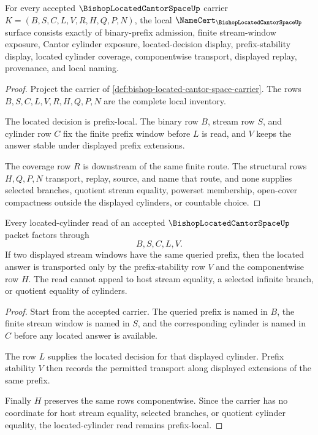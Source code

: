 \begin{theorem}
\label{thm:bishop-located-cantor-space-namecert-obligations}
For every accepted $\BishopLocatedCantorSpaceUp$ carrier $K=(B,S,C,L,V,R,H,Q,P,N)$, the local $\NameCert_{\BishopLocatedCantorSpaceUp}$ surface consists exactly of binary-prefix admission, finite stream-window exposure, Cantor cylinder exposure, located-decision display, prefix-stability display, located cylinder coverage, componentwise transport, displayed replay, provenance, and local naming.
\end{theorem}
\begin{proof}
Project the carrier of \autoref{def:bishop-located-cantor-space-carrier}. The rows $B,S,C,L,V,R,H,Q,P,N$ are the complete local inventory.

The located decision is prefix-local. The binary row $B$, stream row $S$, and cylinder row $C$ fix the finite prefix window before $L$ is read, and $V$ keeps the answer stable under displayed prefix extensions.

The coverage row $R$ is downstream of the same finite route. The structural rows $H,Q,P,N$ transport, replay, source, and name that route, and none supplies selected branches, quotient stream equality, powerset membership, open-cover compactness outside the displayed cylinders, or countable choice.
\end{proof}

\begin{theorem}
\label{thm:bishop-located-cantor-space-prefix-stability}
Every located-cylinder read of an accepted $\BishopLocatedCantorSpaceUp$ packet factors through
$$
B,S,C,L,V .
$$
If two displayed stream windows have the same queried prefix, then the located answer is transported only by the prefix-stability row $V$ and the componentwise row $H$. The read cannot appeal to host stream equality, a selected infinite branch, or quotient equality of cylinders.
\end{theorem}
\begin{proof}
Start from the accepted carrier. The queried prefix is named in $B$, the finite stream window is named in $S$, and the corresponding cylinder is named in $C$ before any located answer is available.

The row $L$ supplies the located decision for that displayed cylinder. Prefix stability $V$ then records the permitted transport along displayed extensions of the same prefix.

Finally $H$ preserves the same rows componentwise. Since the carrier has no coordinate for host stream equality, selected branches, or quotient cylinder equality, the located-cylinder read remains prefix-local.
\end{proof}

